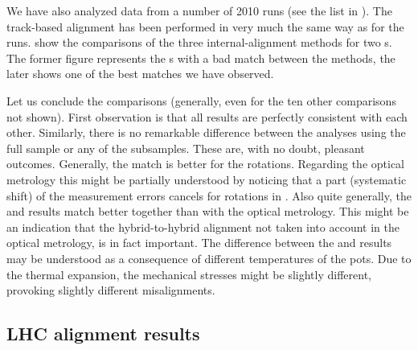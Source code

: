 

We have also analyzed data from a number of 2010  runs (see the list in ). The track-based alignment has been performed in very much the same way as for the  runs.  show the comparisons of the three internal-alignment methods for two s. The former figure represents the s with a bad match between the methods, the later shows one of the best matches we have observed.


Let us conclude the comparisons (generally, even for the ten other comparisons not shown). First observation is that all  results are perfectly consistent with each other. Similarly, there is no remarkable difference between the  analyses using the full sample or any of the subsamples. These are, with no doubt, pleasant outcomes. Generally, the match is better for the rotations. Regarding the optical metrology this might be partially understood by noticing that a part (systematic shift) of the measurement errors cancels for rotations in . Also quite generally, the  and  results match better together than with the optical metrology. This might be an indication that the hybrid-to-hybrid alignment not taken into account in the optical metrology, is in fact important. The difference between the  and  results may be understood as a consequence of different temperatures of the pots. Due to the thermal expansion, the mechanical stresses might be slightly different, provoking slightly different misalignments.


\subsection[al lhc res]{LHC alignment results}

